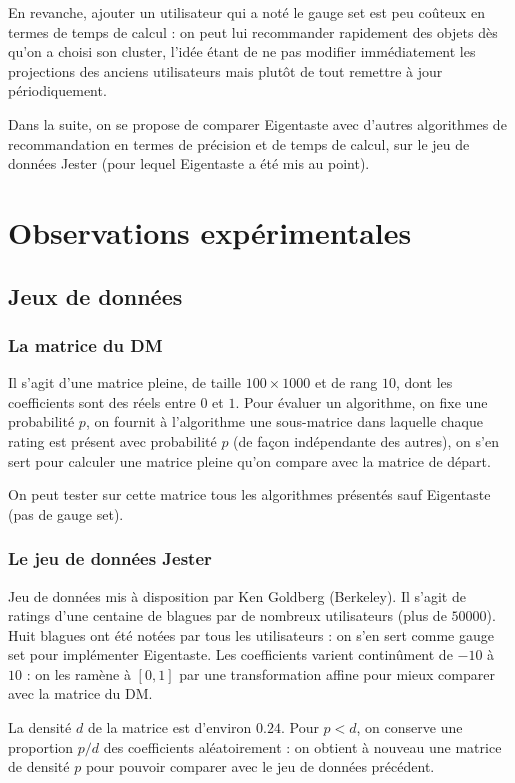\documentclass[11pt, openany, a4paper]{article}
\begin{document}
		En revanche, ajouter un utilisateur qui a noté le gauge set est peu coûteux en termes de temps de calcul : on peut lui recommander rapidement des objets dès qu'on a choisi son cluster, l'idée étant de ne pas modifier immédiatement les projections des anciens utilisateurs mais plutôt de tout remettre à jour périodiquement.
		
		Dans la suite, on se propose de comparer Eigentaste avec d'autres algorithmes de recommandation en termes de précision et de temps de calcul, sur le jeu de données Jester (pour lequel Eigentaste a été mis au point).
		
		
		
		
\section{Observations expérimentales}
	\subsection{Jeux de données}
	\subsubsection{La matrice du DM}
		
		Il s'agit d'une matrice pleine, de taille $100 \times 1000$ et de rang $10$, dont les coefficients sont des réels entre $0$ et $1$. Pour évaluer un algorithme, on fixe une probabilité $p$, on fournit à l'algorithme une sous-matrice dans laquelle chaque rating est présent avec probabilité $p$ (de façon indépendante des autres), on s'en sert pour calculer une matrice pleine qu'on compare avec la matrice de départ.
		
		On peut tester sur cette matrice tous les algorithmes présentés sauf Eigentaste (pas de gauge set).
		
	\subsubsection{Le jeu de données Jester}
		Jeu de données mis à disposition par Ken Goldberg (Berkeley). Il s'agit de ratings d'une centaine de blagues par de nombreux utilisateurs (plus de $50 000$). Huit blagues ont été notées par tous les utilisateurs : on s'en sert comme gauge set pour implémenter Eigentaste. Les coefficients varient continûment de $-10$ à $10$ : on les ramène à $[0,1]$ par une transformation affine pour mieux comparer avec la matrice du DM.
		
		La densité $d$ de la matrice est d'environ $0.24$. Pour $p<d$, on conserve une proportion $p/d$ des coefficients aléatoirement : on obtient à nouveau une matrice de densité $p$ pour pouvoir comparer avec le jeu de données précédent.
		
\end{document}
